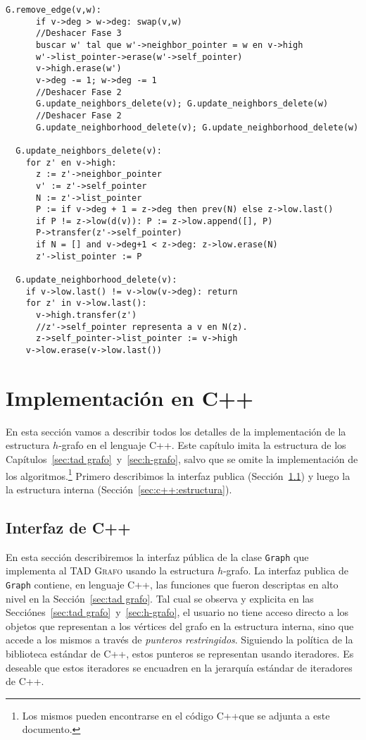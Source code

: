 \documentclass[%
    a4paper,%
    fontsize=12pt,%
    DIV=12,
    twoside,%
    openright,%
    titlepage=true,%
    headsepline,%
    toc=bibliography,%
    parskip=half,%
    cleardoublepage=empty,%
    headings=big,%
]{scrbook}
\makeatletter
\newcommand{\Grafo}{\textsc{Grafo}\xspace}
\newcommand{\Code}[1]{\lstinline[basicstyle={\ttfamily}]@#1@}
\newcommand{\CPPCode}[1]{\lstinline[language=C++,basicstyle={\ttfamily}]@#1@}
\newcommand{\Graph}{\CPPCode{Graph}\xspace}
\DeclareRobustCommand{\CPP}{C\nolinebreak[4]\hspace{-.05em}\raisebox{.4ex}{\relsize{-3}\textbf{++}}\xspace}
\def\CPP{C++}%
\makeatother
\begin{document}
\begin{lstlisting}[caption={Implementación de \Code{remove_edge}.},name=remove_edge,gobble=2,float=ht,label={lst:pseudo:G.remove_edge}]
  G.remove_edge(v,w):
      if v->deg > w->deg: swap(v,w)
      //Deshacer Fase 3
      buscar w' tal que w'->neighbor_pointer = w en v->high
      w'->list_pointer->erase(w'->self_pointer)
      v->high.erase(w')
      v->deg -= 1; w->deg -= 1
      //Deshacer Fase 2
      G.update_neighbors_delete(v); G.update_neighbors_delete(w)
      //Deshacer Fase 2
      G.update_neighborhood_delete(v); G.update_neighborhood_delete(w)
  
  G.update_neighbors_delete(v):
    for z' en v->high:
      z := z'->neighbor_pointer
      v' := z'->self_pointer
      N := z'->list_pointer
      P := if v->deg + 1 = z->deg then prev(N) else z->low.last() 
      if P != z->low(d(v)): P := z->low.append([], P)
      P->transfer(z'->self_pointer)
      if N = [] and v->deg+1 < z->deg: z->low.erase(N)
      z'->list_pointer := P
  
  G.update_neighborhood_delete(v):
    if v->low.last() != v->low(v->deg): return
    for z' in v->low.last():
      v->high.transfer(z')
      //z'->self_pointer representa a v en N(z).
      z->self_pointer->list_pointer := v->high
    v->low.erase(v->low.last())
\end{lstlisting}


\chapter{Implementación en \CPP}
\label{sec:c++}

En esta sección vamos a describir todos los detalles de la implementación de la estructura $h$-grafo en el lenguaje \CPP.  Este capítulo imita la estructura de los Capítulos~\ref{sec:tad grafo}~y~\ref{sec:h-grafo}, salvo que se omite la implementación de los algoritmos.\footnote{Los mismos pueden encontrarse en el código \CPP que se adjunta a este documento.}  Primero describimos la interfaz publica (Sección~\ref{sec:c++:interfaz}) y luego la la estructura interna (Sección~\ref{sec:c++:estructura}).  


\section{Interfaz de \CPP}
\label{sec:c++:interfaz}

En esta sección describiremos la interfaz pública de la clase \Graph que implementa al TAD \Grafo usando la estructura $h$-grafo.  La interfaz publica de \Graph contiene, en lenguaje \CPP, las funciones que fueron descriptas en alto nivel en la Sección~\ref{sec:tad grafo}.
Tal cual se observa y explicita en las Secciónes~\ref{sec:tad grafo}~y~\ref{sec:h-grafo}, el usuario no tiene acceso directo a los objetos que representan a los vértices del grafo en la estructura interna, sino que accede a los mismos a través de \emph{punteros restringidos}.  Siguiendo la política de la biblioteca estándar de \CPP, estos punteros se representan usando iteradores.  Es deseable que estos iteradores se encuadren en la jerarquía estándar de iteradores de \CPP.
\end{document}
